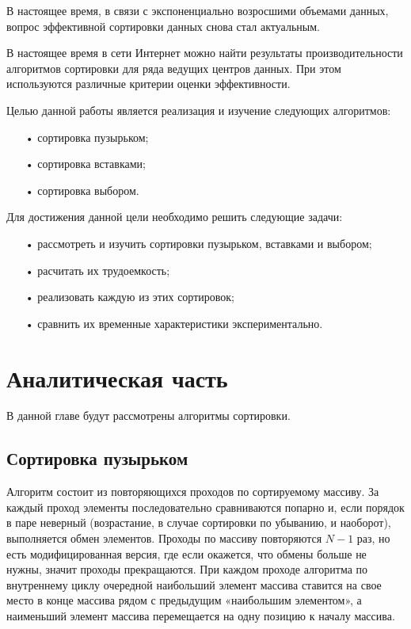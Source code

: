 \documentclass[14pt,russian]{scrartcl}
\begin{document}
В настоящее время, в связи с экспоненциально возросшими объемами данных, вопрос эффективной сортировки данных снова стал актуальным.

В настоящее время в сети Интернет можно найти результаты производительности алгоритмов сортировки для ряда ведущих центров данных.
При этом используются различные критерии оценки эффективности. 

Целью данной работы является реализация и изучение следующих алгоритмов:

\begin{enumerate}
    \item[•] сортировка пузырьком;
    \item[•] сортировка вставками;
    \item[•] сортировка выбором.
\end{enumerate}

Для достижения данной цели необходимо решить следующие задачи:

\begin{enumerate}
    \item[•] рассмотреть и изучить сортировки пузырьком, вставками и выбором;
    \item[•] расчитать их трудоемкость;
    \item[•] реализовать каждую из этих сортировок;
    \item[•] сравнить их временные характеристики экспериментально.
\end{enumerate}

\section{Аналитическая часть}
В данной главе будут рассмотрены алгоритмы сортировки.

\subsection{Сортировка пузырьком}


Алгоритм состоит из повторяющихся проходов по сортируемому массиву. За каждый проход элементы последовательно сравниваются попарно и, если порядок в паре неверный (возрастание, в случае сортировки по убыванию, и наоборот), выполняется обмен элементов. Проходы по массиву повторяются $N - 1$ раз, но есть модифицированная версия, где если окажется, что обмены больше не нужны, значит проходы прекращаются. При каждом проходе алгоритма по внутреннему циклу очередной наибольший элемент массива ставится на свое место в конце массива рядом с предыдущим «наибольшим элементом», а наименьший элемент массива перемещается на одну позицию к началу массива.
\end{document}
